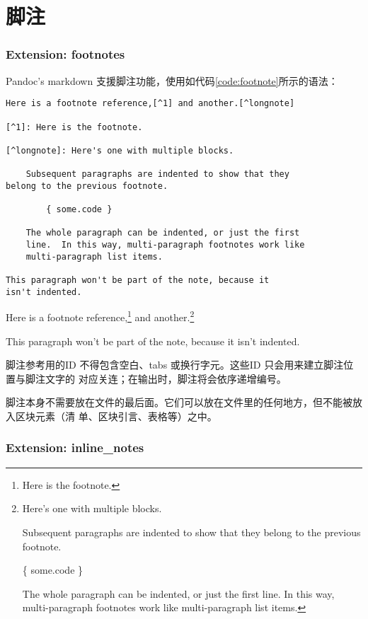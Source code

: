 \documentclass[fancyhdr,bookmark]{ctexbook}
\begin{document}
\hypertarget{ux811aux6ce8}{%
\section{脚注}\label{ux811aux6ce8}}

\hypertarget{extension-footnotes}{%
\subsubsection{Extension: footnotes}\label{extension-footnotes}}

Pandoc's markdown
支援脚注功能，使用如代码\ref{code:footnote}所示的语法：

\begin{lstlisting}[caption=脚注语法, label=code:footnote, float=htbp]
Here is a footnote reference,[^1] and another.[^longnote]

[^1]: Here is the footnote.

[^longnote]: Here's one with multiple blocks.

    Subsequent paragraphs are indented to show that they
belong to the previous footnote.

        { some.code }

    The whole paragraph can be indented, or just the first
    line.  In this way, multi-paragraph footnotes work like
    multi-paragraph list items.

This paragraph won't be part of the note, because it
isn't indented.
\end{lstlisting}

Here is a footnote reference,\footnote{Here is the footnote.} and
another.\footnote{Here's one with multiple blocks.

  Subsequent paragraphs are indented to show that they belong to the
  previous footnote.

  \{ some.code \}

  The whole paragraph can be indented, or just the first line. In this
  way, multi-paragraph footnotes work like multi-paragraph list items.}

This paragraph won't be part of the note, because it isn't indented.

脚注参考用的ID 不得包含空白、tabs 或换行字元。这些ID
只会用来建立脚注位置与脚注文字的
对应关连；在输出时，脚注将会依序递增编号。

脚注本身不需要放在文件的最后面。它们可以放在文件里的任何地方，但不能被放入区块元素（清
单、区块引言、表格等）之中。

\hypertarget{extension-inline_notes}{%
\subsubsection{Extension: inline\_notes}\label{extension-inline_notes}}
\end{document}
